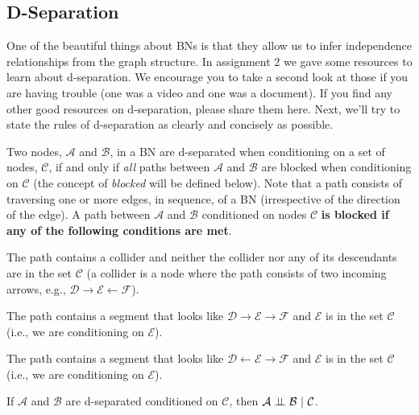 \documentclass[review_Solutions]{subfiles}
\begin{document}
\subsection{D-Separation}
One of the beautiful things about BNs is that they allow us to infer independence relationships from the graph structure.  In assignment 2 we gave some resources to learn about d-separation.  We encourage you to take a second look at those if you are having trouble (one was a video and one was a document).  If you find any other good resources on d-separation, please share them here.  Next, we'll try to state the rules of d-separation as clearly and concisely as possible.
\vspace{1em}
\begin{recall}
Two nodes, $\mathcal{A}$ and $\mathcal{B}$, in a BN are d-separated when conditioning on a set of nodes, $\mathcal{C}$, if and only if \emph{all} paths between  $\mathcal{A}$ and $\mathcal{B}$ are blocked when conditioning on $\mathcal{C}$ (the concept of \emph{blocked} will be defined below).  Note that a path consists of traversing one or more edges, in sequence, of a BN (irrespective of the direction of the edge).  A path between $\mathcal{A}$ and $\mathcal{B}$ conditioned on nodes $\mathcal{C}$ \textbf{is blocked if any of the following conditions are met}.
\be
\item The path contains a collider and neither the collider nor any of its descendants are in the set $\mathcal{C}$ (a collider is a node where the path consists of two incoming arrows, e.g., $\mathcal{D} \rightarrow \mathcal{E} \leftarrow \mathcal{F}$).
\item The path contains a segment that looks like $\mathcal{D} \rightarrow \mathcal{E} \rightarrow \mathcal{F}$ and $\mathcal{E}$ is in the set $\mathcal{C}$ (i.e., we are conditioning on $\mathcal{E}$).
\item The path contains a segment that looks like $\mathcal{D} \leftarrow \mathcal{E} \rightarrow \mathcal{F}$ and $\mathcal{E}$ is in the set $\mathcal{C}$ (i.e., we are conditioning on $\mathcal{E}$).
\ee


\vspace{1em}
\noindent If $\mathcal{A}$ and $\mathcal{B}$ are d-separated conditioned on $\mathcal{C}$, then $\mathcal{A} \perp\!\!\!\perp \mathcal{B}~|~\mathcal{C}$.

\end{recall}
\end{document}
